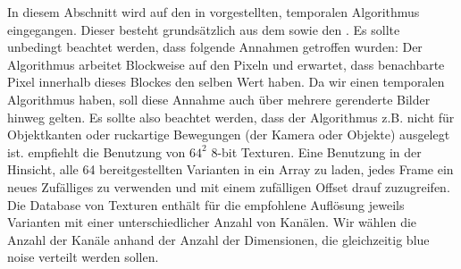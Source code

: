 In diesem Abschnitt wird auf den in \cite{hal02158423} vorgestellten, temporalen Algorithmus eingegangen.
Dieser besteht grundsätzlich aus dem  sowie den 
. Es sollte unbedingt beachtet werden, dass folgende
Annahmen getroffen wurden: Der Algorithmus arbeitet Blockweise auf den Pixeln und erwartet, dass benachbarte
Pixel innerhalb dieses Blockes den selben Wert haben. Da wir einen temporalen Algorithmus haben, soll diese Annahme 
auch über mehrere gerenderte Bilder hinweg gelten. Es sollte also beachtet werden, dass der Algorithmus z.B. nicht 
für Objektkanten oder ruckartige Bewegungen (der Kamera oder Objekte) ausgelegt ist.
\cite{heitz:hal-02150657}
\cite{bluenoisechrisschied} empfiehlt die Benutzung von $64^{2}$ 8-bit 
Texturen. Eine Benutzung in der Hinsicht, alle 64 bereitgestellten Varianten
in ein Array zu laden, jedes Frame ein neues Zufälliges zu verwenden und
mit einem zufälligen Offset drauf zuzugreifen. Die Database von Texturen 
\cite{bluenoisechrisschied} enthält für die empfohlene Auflösung jeweils
Varianten mit einer unterschiedlicher Anzahl von Kanälen. Wir wählen
die Anzahl der Kanäle anhand der Anzahl der Dimensionen, die gleichzeitig
blue noise verteilt werden sollen.

